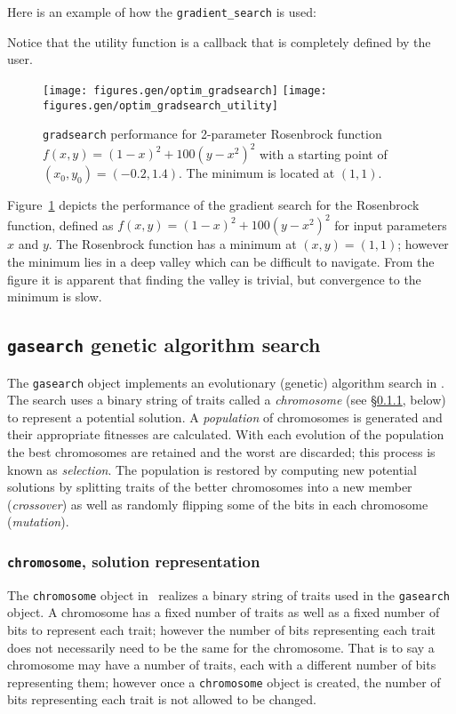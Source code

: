 %
Here is an example of how the {\tt gradient\_search} is used:
% 

%
Notice that the utility function is a callback that is completely
defined by the user.
%
\begin{figure}
\centering
  \texttt{[image: figures.gen/optim\_gradsearch]}
  \texttt{[image: figures.gen/optim\_gradsearch\_utility]}
\caption{
    {\tt gradsearch} performance for 2-parameter Rosenbrock function
    $f(x,y) = (1-x)^2 + 100(y-x^2)^2$
    with a starting point of $(x_0,y_0)=(-0.2,1.4)$.
    The minimum is located at $(1,1)$.}
\label{fig:module:optim:gradsearch}
\end{figure}
%
Figure~\ref{fig:module:optim:gradsearch} depicts the performance of the
gradient search for the Rosenbrock function, defined as
$f(x,y) = (1-x)^2 + 100(y-x^2)^2$ for input parameters $x$ and $y$.
The Rosenbrock function has a minimum at $(x,y)=(1,1)$;
however the minimum lies in a deep valley which can be difficult to
navigate.
From the figure it is apparent that finding the valley is trivial,
but convergence to the minimum is slow.


\subsection{{\tt gasearch} genetic algorithm search}
\label{module:optim:gasearch}

The {\tt gasearch} object implements an evolutionary (genetic)
algorithm search in \liquid.
The search uses a binary string of traits called a {\em chromosome}
(see \S\ref{module:optim:gasearch:chromosome}, below)
to represent a potential solution.
A {\em population} of chromosomes is generated and their appropriate
fitnesses are calculated.
With each evolution of the population the best chromosomes are retained
and the worst are discarded; this process is known as {\em selection}.
The population is restored by computing new potential solutions by
splitting traits of the better chromosomes into a new member
({\em crossover}) as well as randomly flipping some of the bits in each
chromosome ({\em mutation}).

\subsubsection{{\tt chromosome}, solution representation}
\label{module:optim:gasearch:chromosome}
The {\tt chromosome} object in \liquid\ realizes a binary string of
traits used in the {\tt gasearch} object.
A chromosome has a fixed number of traits as well as a fixed number of
bits to represent each trait;
however the number of bits representing each trait does not necessarily
need to be the same for the chromosome.
That is to say a chromosome may have a number of traits, each with a
different number of bits representing them;
however once a {\tt chromosome} object is created, the number of bits
representing each trait is not allowed to be changed.

